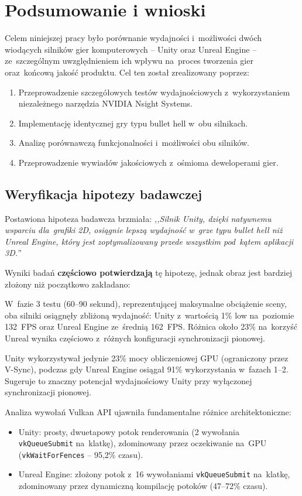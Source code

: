\clearpage
\raggedbottom
\section{Podsumowanie i wnioski}

Celem niniejszej pracy było porównanie wydajności i~możliwości dwóch wiodących silników gier komputerowych -- Unity oraz Unreal Engine -- ze~szczególnym uwzględnieniem ich wpływu na~proces tworzenia gier oraz~końcową jakość produktu. Cel ten został zrealizowany poprzez:

\begin{enumerate}
    \item Przeprowadzenie szczegółowych testów wydajnościowych z~wykorzystaniem niezależnego narzędzia NVIDIA Nsight Systems.
    \item Implementację identycznej gry typu bullet hell w~obu silnikach.
    \item Analizę porównawczą funkcjonalności i~możliwości obu silników.
    \item Przeprowadzenie wywiadów jakościowych z~ośmioma deweloperami gier.
\end{enumerate}

\subsection{Weryfikacja hipotezy badawczej}

Postawiona hipoteza badawcza brzmiała: \textit{,,Silnik Unity, dzięki natywnemu wsparciu 
dla~grafiki 2D, osiągnie lepszą wydajność w~grze typu bullet hell niż Unreal Engine, 
który jest zoptymalizowany przede wszystkim pod~kątem aplikacji 3D.''}

Wyniki badań \textbf{częściowo potwierdzają} tę hipotezę, jednak obraz jest bardziej złożony niż początkowo zakładano:

W~fazie 3 testu (60--90 sekund), reprezentującej maksymalne obciążenie sceny, oba silniki osiągnęły zbliżoną wydajność: Unity z~wartością 1\% low na~poziomie 132~FPS oraz Unreal Engine ze~średnią 162~FPS. Różnica około 23\% na~korzyść Unreal wynika częściowo z~różnych konfiguracji synchronizacji pionowej.

Unity wykorzystywał jedynie 23\% mocy obliczeniowej GPU (ograniczony przez V-Sync), podczas gdy Unreal Engine osiągał 91\% wykorzystania w~fazach 1--2. Sugeruje to znaczny potencjał wydajnościowy Unity przy wyłączonej synchronizacji pionowej.

Analiza wywołań Vulkan API ujawniła fundamentalne różnice architektoniczne:
\begin{itemize}
    \item Unity: prosty, dwuetapowy potok renderowania (2 wywołania \\ \texttt{vkQueueSubmit} na~klatkę), 
    zdominowany przez oczekiwanie na~GPU \\ (\texttt{vkWaitForFences} -- 95,2\% czasu).
    \item Unreal Engine: złożony potok z~16 wywołaniami \texttt{vkQueueSubmit} na~klatkę, zdominowany przez dynamiczną kompilację potoków (47--72\% czasu).
\end{itemize}

